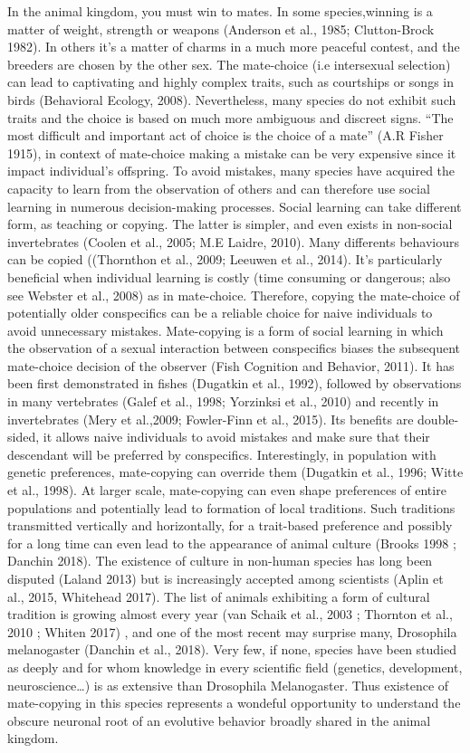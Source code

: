 \documentclass[a4paper, 12pt]{article}
\begin{document}
	In the animal kingdom, you must win to mates. In some species,winning is a matter of weight, strength or weapons (Anderson et al., 1985; Clutton-Brock 1982). In others it’s a matter of charms in a much more peaceful contest, and the breeders are chosen by the other sex. The mate-choice (i.e intersexual selection) can lead to captivating and highly complex traits, such as courtships or songs in birds (Behavioral Ecology, 2008). Nevertheless, many species do not exhibit such traits and the choice is based on much more ambiguous and discreet signs.  “The most difficult and important act of choice is the choice of a mate” (A.R Fisher 1915), in context of mate-choice making a mistake can be very expensive since it impact individual’s offspring.
	To avoid mistakes, many species have acquired the capacity to learn from the observation of others and can therefore use social learning in numerous decision-making processes.
	Social learning can take different form, as teaching or copying. The latter is simpler, and even exists in non-social invertebrates (Coolen et al., 2005; M.E Laidre, 2010). Many differents behaviours can be copied ((Thornthon et al., 2009; Leeuwen et al., 2014). It’s particularly beneficial when individual learning is costly (time consuming or dangerous; also see Webster et al., 2008) as in mate-choice. Therefore, copying the mate-choice of potentially older conspecifics can be a reliable choice for naive individuals to avoid unnecessary mistakes.
	Mate-copying is a form of social learning in which the observation of a sexual interaction between conspecifics biases the subsequent mate-choice decision of the observer (Fish Cognition and Behavior, 2011). It has been first demonstrated in fishes (Dugatkin et al., 1992), followed by observations in many vertebrates (Galef et al., 1998; Yorzinksi et al., 2010) and recently in invertebrates (Mery et al.,2009; Fowler-Finn et al., 2015). Its benefits are  double-sided, it allows naive individuals to avoid mistakes and make sure that their descendant will be preferred by conspecifics. Interestingly, in population with genetic preferences, mate-copying can override them (Dugatkin et al., 1996; Witte et al., 1998). At larger  scale, mate-copying can even shape preferences of entire populations and potentially lead to formation of local traditions. Such traditions transmitted vertically and horizontally, for a trait-based preference and possibly for a long time can even lead to the appearance of  animal culture (Brooks 1998 ; Danchin 2018).
	The existence of culture in non-human species has long been disputed (Laland 2013) but is increasingly accepted among scientists (Aplin et al., 2015, Whitehead 2017). The list of animals exhibiting a form of cultural tradition is growing almost every year (van Schaik et al., 2003 ; Thornton et al., 2010 ; Whiten 2017) , and one of the most recent may surprise many, Drosophila melanogaster (Danchin et al., 2018). Very few, if none, species have been studied as deeply and for whom knowledge in every scientific field (genetics, development, neuroscience…) is as extensive than Drosophila Melanogaster. Thus existence of mate-copying in this species represents a wondeful opportunity to understand the obscure neuronal root of an evolutive behavior broadly shared in the animal kingdom.
\end{document}
